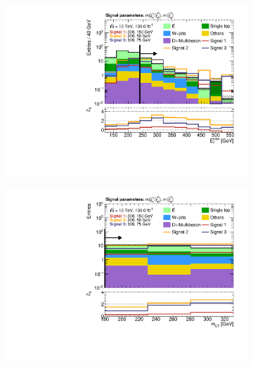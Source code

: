 \begin{figure}
	\centering
	\begin{subfigure}[b]{0.4\linewidth}
		\centering\includegraphics[width=\textwidth]{n1_SRLM_mct_bins/met.pdf}
		\caption{\label{fig:Wh_reopt_second_round_n1_srlm_met}}
	\end{subfigure}%
	\begin{subfigure}[b]{0.4\linewidth}
		\centering\includegraphics[width=\textwidth]{n1_SRLM_mct_bins/mct.pdf}
		\caption{\label{fig:Wh_reopt_second_round_n1_srlm_mct}}
	\end{subfigure}
	\begin{subfigure}[b]{0.4\linewidth}

\end{subfigure}
\end{figure}
